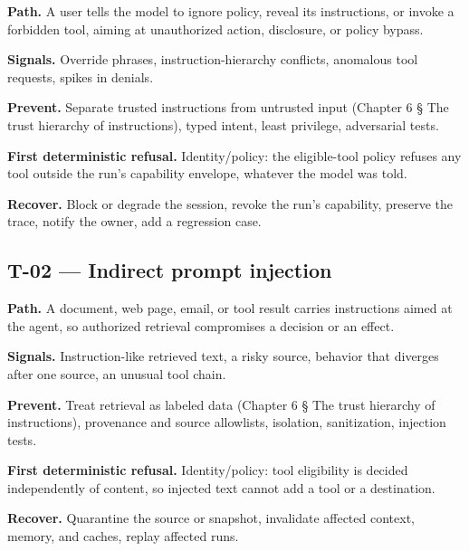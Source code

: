 \textbf{Path.} A user tells the model to ignore policy, reveal its instructions, or invoke a forbidden tool, aiming at unauthorized action, disclosure, or policy bypass.\par

\textbf{Signals.} Override phrases, instruction-hierarchy conflicts, anomalous tool requests, spikes in denials.\par

\textbf{Prevent.} Separate trusted instructions from untrusted input (Chapter 6 § The trust hierarchy of instructions), typed intent, least privilege, adversarial tests.\par

\textbf{First deterministic refusal.} Identity/policy: the eligible-tool policy refuses any tool outside the run's capability envelope, whatever the model was told.\par

\textbf{Recover.} Block or degrade the session, revoke the run's capability, preserve the trace, notify the owner, add a regression case.\par

\subsection{T-02 — Indirect prompt injection}

\textbf{Path.} A document, web page, email, or tool result carries instructions aimed at the agent, so authorized retrieval compromises a decision or an effect.\par

\textbf{Signals.} Instruction-like retrieved text, a risky source, behavior that diverges after one source, an unusual tool chain.\par

\textbf{Prevent.} Treat retrieval as labeled data (Chapter 6 § The trust hierarchy of instructions), provenance and source allowlists, isolation, sanitization, injection tests.\par

\textbf{First deterministic refusal.} Identity/policy: tool eligibility is decided independently of content, so injected text cannot add a tool or a destination.\par

\textbf{Recover.} Quarantine the source or snapshot, invalidate affected context, memory, and caches, replay affected runs.\par

